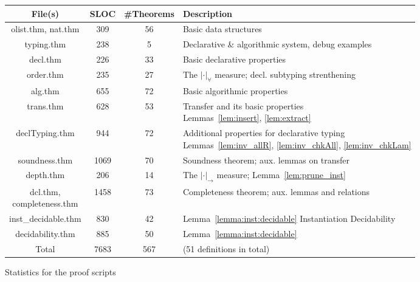 \begin{figure}
\centering\begin{tabular}{|c|c|c|l|}\hline
    File(s) & SLOC & \#Theorems & Description\\\hline
    olist.thm, nat.thm  &  309 & 56  & Basic data structures\\\hline
    typing.thm          &  238 & 5   & Declarative \& algorithmic system, debug examples\\\hline
    decl.thm            &  226 & 33  & Basic declarative properties\\\hline
    order.thm           &  235 & 27  & The $|\cdot|_\forall$ measure; decl. subtyping strenthening\\\hline
    alg.thm             &  655 & 72  & Basic algorithmic properties\\\hline
    trans.thm           &  628 & 53  & \makecell[l]{Transfer and its basic properties \\
                            Lemmas~\ref{lem:insert}, \ref{lem:extract}}\\\hline
    declTyping.thm      &  944 & 72  & \makecell[l]{Additional properties for declarative typing \\
                            Lemmas~\ref{lem:inv_allR}, \ref{lem:inv_chkAll}, \ref{lem:inv_chkLam}}\\\hline
    soundness.thm       & 1069 & 70  & Soundness theorem; aux. lemmas on transfer\\\hline
    depth.thm           &  206 & 14  & \makecell[l]{The $|\cdot|_\to$ measure; \\
                            Lemma~\ref{lem:prune_inst}}\\\hline
    \makecell{dcl.thm, \\completeness.thm} & 1458 & 73  &
                            Completeness theorem; aux. lemmas and relations\\\hline
    inst\_decidable.thm &  830 & 42  & Lemma~\ref{lemma:inst:decidable} Instantiation Decidability\\\hline
    decidability.thm    &  885 & 50  & Lemma~\ref{lemma:inst:decidable}\\\hline
    Total               & 7683 & 567 & (51 definitions in total)\\\hline
\end{tabular}
\caption{Statistics for the proof scripts}
\label{fig:proof_statistics}
\end{figure}

